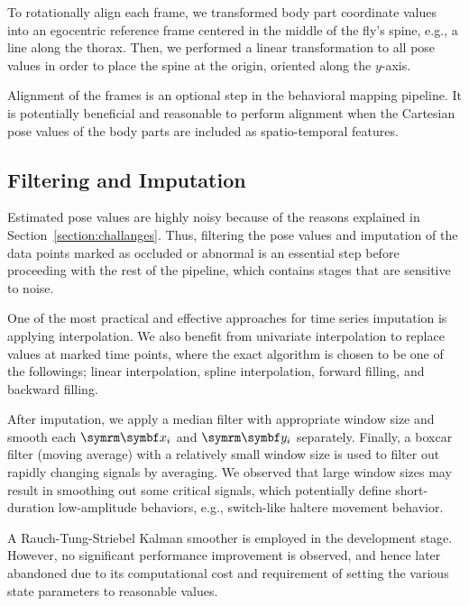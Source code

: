 To rotationally align each frame, we transformed body part coordinate values into an egocentric reference frame centered in the middle of the fly's spine, e.g., a line along the thorax.
Then, we performed a linear transformation to all pose values in order to place the spine at the origin, oriented along the $y$-axis.

Alignment of the frames is an optional step in the behavioral mapping pipeline.
It is potentially beneficial and reasonable to perform alignment when the Cartesian pose values of the body parts are included as spatio-temporal features.

\subsection{Filtering and Imputation}
Estimated pose values are highly noisy because of the reasons explained in Section~\ref{section:challanges}.
Thus, filtering the pose values and imputation of the data points marked as occluded or abnormal is an essential step before proceeding with the rest of the pipeline, which contains stages that are sensitive to noise.

One of the most practical and effective approaches for time series imputation is applying interpolation.
We also benefit from univariate interpolation to replace values at marked time points, where the exact algorithm is chosen to be one of the followings; linear interpolation, spline interpolation, forward filling, and backward filling.

After imputation, we apply a median filter with appropriate window size and smooth each $\V{x_i}$ and $\V{y_i}$ separately.
Finally, a boxcar filter (moving average) with a relatively small window size is used to filter out rapidly changing signals by averaging.
We observed that large window sizes may result in smoothing out some critical signals, which potentially define short-duration low-amplitude behaviors, e.g., switch-like haltere movement behavior.

A Rauch-Tung-Striebel Kalman smoother \citep{rauch_maximum_1965} is employed in the development stage.
However, no significant performance improvement is observed, and hence later abandoned due to its computational cost and requirement of setting the various state parameters to reasonable values.

